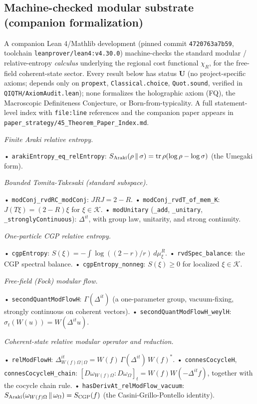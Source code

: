 \documentclass[11pt,a4paper]{article}
\begin{document}
\subsection{Machine-checked modular substrate (companion formalization)}

A companion Lean 4/Mathlib development (pinned commit \texttt{4720763a7b59}, toolchain \texttt{leanprover/lean4:v4.30.0}) machine-checks the standard modular / relative-entropy \emph{calculus} underlying the regional cost functional $\chi_R$, for the free-field coherent-state sector. Every result below has status \textbf{U} (no project-specific axioms; depends only on \texttt{propext}, \texttt{Classical.choice}, \texttt{Quot.sound}, verified in \texttt{QIQTH/AxiomAudit.lean}); none formalizes the holographic axiom (FQ), the Macroscopic Definiteness Conjecture, or Born-from-typicality. A full statement-level index with \texttt{file:line} references and the companion paper appears in \texttt{paper\_strategy/45\_Theorem\_Paper\_Index.md}.

\emph{Finite Araki relative entropy.}

  • \texttt{arakiEntropy\_eq\_relEntropy}: $S_{\rm Araki}(\rho\,\|\,\sigma)=\operatorname{tr}\rho(\log\rho-\log\sigma)$ (the Umegaki form).

\emph{Bounded Tomita-Takesaki (standard subspace).}

  • \texttt{modConj\_rvdRC\_modConj}: $JRJ=2-R$.
  • \texttt{modConj\_rvdT\_of\_mem\_K}: $J(T\xi)=(2-R)\xi$ for $\xi\in\mathcal{K}$.
  • \texttt{modUnitary} (\texttt{\_add}, \texttt{\_unitary}, \texttt{\_stronglyContinuous}): $\Delta^{it}$, with group law, unitarity, and strong continuity.

\emph{One-particle CGP relative entropy.}

  • \texttt{cgpEntropy}: $S(\xi)=-\int\log((2-r)/r)\,d\mu^R_\xi$.
  • \texttt{rvdSpec\_balance}: the CGP spectral balance.
  • \texttt{cgpEntropy\_nonneg}: $S(\xi)\ge 0$ for localized $\xi\in\mathcal{K}$.

\emph{Free-field (Fock) modular flow.}

  • \texttt{secondQuantModFlowH}: $\Gamma(\Delta^{it})$ (a one-parameter group, vacuum-fixing, strongly continuous on coherent vectors).
  • \texttt{secondQuantModFlowH\_weylH}: $\sigma_t(W(u))=W(\Delta^{it}u)$.

\emph{Coherent-state relative modular operator and reduction.}

  • \texttt{relModFlowH}: $\Delta^{it}_{W(f)\Omega\,|\,\Omega}=W(f)\,\Gamma(\Delta^{it})\,W(f)^*$.
  • \texttt{connesCocycleH}, \texttt{connesCocycleH\_chain}: $[D\omega_{W(f)\Omega}:D\omega_\Omega]_t=W(f)W(-\Delta^{it}f)$, together with the cocycle chain rule.
  • \texttt{hasDerivAt\_relModFlow\_vacuum}: $S_{\rm Araki}(\omega_{W(f)\Omega}\,\|\,\omega_\Omega)=S_{\rm CGP}(f)$ (the Casini-Grillo-Pontello identity).
\end{document}

